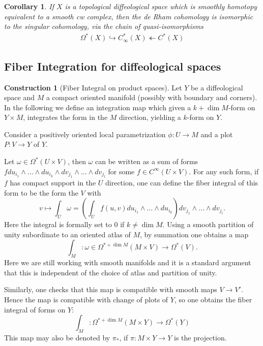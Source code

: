 \documentclass{scrartcl}
\theoremstyle{plain}
\newtheorem{corollary}[theorem]{Corollary}
\theoremstyle{definition}
\newtheorem{construction}[theorem]{Construction}
\newcommand{\injto}{\hookrightarrow}
\newcommand{\surjfrom}{\twoheadleftarrow}
\begin{document}
\begin{corollary}
    If $X$ is a topological diffeological space which is smoothly homotopy equivalent to a smooth cw complex, then the de Rham cohomology is isomorphic to the singular cohomology, via the chain of quasi-isomorphisms
    \begin{align*}
        \Omega^*(X) \injto C^*_{\infty}(X) \surjfrom C^*(X) 
    \end{align*}
\end{corollary}

\subsection{Fiber Integration for diffeological spaces}
\begin{construction}[Fiber Integral on product spaces]
Let $Y$ be a diffeological space and $M$ a compact oriented manifold (possibly with boundary and corners). In the following we define an integration map which given a $k+\dim M$-form on $Y\times M$, integrates the form in the $M$ direction, yielding a $k$-form on $Y$.

Consider a positively oriented local parametrization $\phi\colon U\to M$ and a plot $P\colon V\to Y$ of $Y$.

Let $\omega\in\Omega^*(U\times V)$, then $\omega$ can be written as a sum of forms $f du_{i_1}\wedge\dots \wedge du_{i_k}\wedge dv_{j_1}\wedge\dots\wedge dv_{j_l}$ for some $f\in C^\infty(U\times V)$. For any such form, if $f$ has compact support in the $U$ direction, one can define the fiber integral of this form to be the form the $V$ with $$v\mapsto \int_U \omega = \left(\int_U f(u, v) du_{i_1}\wedge\dots \wedge du_{i_k} \right) dv_{j_1}\wedge\dots\wedge dv_{j_l}.$$
Here the integral is formally set to $0$ if $k\neq \dim M$. Using a smooth partition of unity subordinate to an oriented atlas of $M$, by summation one obtains a map $$\int_M\colon\omega\in\Omega^{*+\dim M}(M\times V)\to\Omega^*(V).$$
Here we are still working with smooth manifolds and it is a standard argument that this is independent of the choice of atlas and partition of unity. 

Similarly, one checks that this map is compatible with smooth maps $V\to V'$. Hence the map is compatible with change of plots of $Y$, so one obtains the fiber integral of forms on $Y$:
$$\int_M\colon \Omega^{*+\dim M}(M\times Y)\to \Omega^*(Y)$$
This map may also be denoted by $\pi_*$, if $\pi\colon M\times Y\to Y$ is the projection. 


\end{construction}
\end{document}
